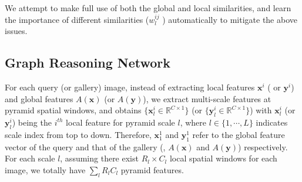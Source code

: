 \documentclass[10pt,twocolumn,letterpaper]{article}
\begin{document}
We attempt to make full use of both the global and local similarities, and learn the importance of different similarities (\ie $w_l^{ij}$ ) automatically to mitigate the above issues.


\subsection{Graph Reasoning Network}
For each query (or gallery) image, instead of extracting local features $\mathbf{x}^i$ ( or $\mathbf{y}^i$) and global features $A(\mathbf{x})$ (or $A(\mathbf{y})$), we extract multi-scale features at pyramid spatial windows, and obtains $ \{\mathbf{x}_l^i \in \mathbb{R}^{C\times 1}\} $ (or $ \{\mathbf{y}_l^i \in \mathbb{R}^{C\times 1}\} $) with $\mathbf{x}_l^i$ (or $\mathbf{y}_l^i$) being the $i^{th}$ local feature for pyramid scale $l$, where $l \in \{1,\cdots,L\}$ indicates scale index from top to down.  Therefore, $\mathbf{x}_1^{1}$ and $\mathbf{y}_1^{1}$ refer to the global feature vector of the query and that of the gallery (\ie, $A(\mathbf{x})$ and $A(\mathbf{y})$)  respectively.  For each scale $l$, assuming there exist $R_l\times C_l$ local spatial windows for each image, we totally have $\sum_l{R_lC_l}$ pyramid features.
\end{document}

